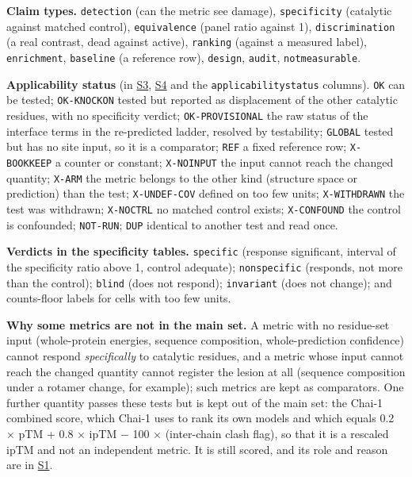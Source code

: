 \documentclass[
  10pt,
]{article}
\DeclareRobustCommand{\_}{\textunderscore\hspace{0pt}}
\begin{document}
\textbf{Claim
types.}
\texttt{detection}
(can the metric see
damage),
\texttt{specificity}
(catalytic against
matched control),
\texttt{equivalence}
(panel ratio against
1),
\texttt{discrimination}
(a real contrast,
dead against
active),
\texttt{ranking}
(against a measured
label),
\texttt{enrichment},
\texttt{baseline} (a
reference row),
\texttt{design},
\texttt{audit},
\texttt{not\_measurable}.

\textbf{Applicability
status} (in
\protect\hyperlink{S3}{S3},
\protect\hyperlink{S4}{S4}
and the
\texttt{applicability\_status}
columns).
\texttt{OK} can be
tested;
\texttt{OK-KNOCKON}
tested but reported
as displacement of
the other catalytic
residues, with no
specificity verdict;
\texttt{OK-PROVISIONAL}
the raw status of
the interface terms
in the re-predicted
ladder, resolved by
testability;
\texttt{GLOBAL}
tested but has no
site input, so it is
a comparator;
\texttt{REF} a fixed
reference row;
\texttt{X-BOOKKEEP}
a counter or
constant;
\texttt{X-NOINPUT}
the input cannot
reach the changed
quantity;
\texttt{X-ARM} the
metric belongs to
the other kind
(structure space or
prediction) than the
test;
\texttt{X-UNDEF-COV}
defined on too few
units;
\texttt{X-WITHDRAWN}
the test was
withdrawn;
\texttt{X-NOCTRL} no
matched control
exists;
\texttt{X-CONFOUND}
the control is
confounded;
\texttt{NOT-RUN};
\texttt{DUP}
identical to another
test and read once.

\textbf{Verdicts in
the specificity
tables.}
\texttt{specific}
(response
significant,
interval of the
specificity ratio
above 1, control
adequate);
\texttt{non\_specific}
(responds, not more
than the control);
\texttt{blind} (does
not respond);
\texttt{invariant}
(does not change);
and counts-floor
labels for cells
with too few units.

\textbf{Why some
metrics are not in
the main set.} A
metric with no
residue-set input
(whole-protein
energies, sequence
composition,
whole-prediction
confidence) cannot
respond
\emph{specifically}
to catalytic
residues, and a
metric whose input
cannot reach the
changed quantity
cannot register the
lesion at all
(sequence
composition under a
rotamer change, for
example); such
metrics are kept as
comparators. One
further quantity
passes these tests
but is kept out of
the main set: the
Chai-1 combined
score, which Chai-1
uses to rank its own
models and which
equals 0.2 × pTM +
0.8 × ipTM − 100 ×
(inter-chain clash
flag), so that it is
a rescaled ipTM and
not an independent
metric. It is still
scored, and its role
and reason are in
\protect\hyperlink{S1}{S1}.
\end{document}

